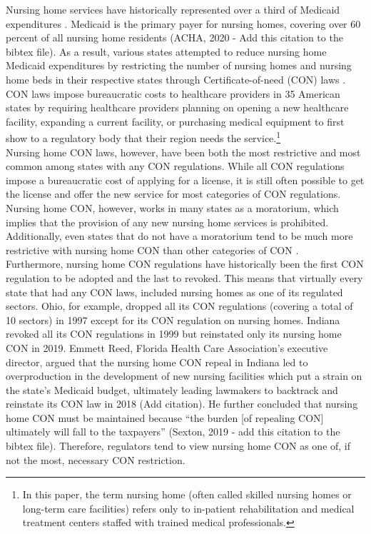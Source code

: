 \documentclass[../Main.tex]{subfiles}
\begin{document}
Nursing home services have historically represented over a third of Medicaid expenditures \citep{wiener1999controlling}. Medicaid is the primary payer for nursing homes, covering over 60 percent of all nursing home residents (ACHA, 2020 - Add this citation to the bibtex file). As a result, various states attempted to reduce nursing home Medicaid expenditures by restricting the number of nursing homes and nursing home beds in their respective states through Certificate-of-need (CON) laws \citep{feder1980regulating,grabowski2003effects,rahman2016impact}. CON laws impose bureaucratic costs to healthcare providers in 35 American states by requiring healthcare providers planning on opening a new healthcare facility, expanding a current facility, or purchasing medical equipment to first show to a regulatory body that their region needs the service.\footnote{In this paper, the term nursing home (often called skilled nursing homes or long-term care facilities) refers only to in-patient rehabilitation and medical treatment centers staffed with trained medical professionals.}\\
\indent Nursing home CON laws, however, have been both the most restrictive and most common among states with any CON regulations. While all CON regulations impose a bureaucratic cost of applying for a license, it is still often possible to get the license and offer the new service for most categories of CON regulations.  Nursing home CON, however, works in many states as a moratorium, which implies that the provision of any new nursing home services is prohibited. Additionally, even states that do not have a moratorium tend to be much more restrictive with nursing home CON than other categories of CON \citep{american2020american}.\\
\indent Furthermore, nursing home CON regulations have historically been the first CON regulation to be adopted and the last to revoked. This means that virtually every state that had any CON laws, included nursing homes as one of its regulated sectors. Ohio, for example, dropped all its CON regulations (covering a total of 10 sectors) in 1997 except for its CON regulation on nursing homes. Indiana revoked all its CON regulations in 1999 but reinstated only its nursing home CON in 2019. Emmett Reed, Florida Health Care Association’s executive director, argued that the nursing home CON repeal in Indiana led to overproduction in the development of new nursing facilities which put a strain on the state’s Medicaid budget, ultimately leading lawmakers to backtrack and reinstate its CON law in 2018 (Add citation). He further concluded that nursing home CON must be maintained because “the burden [of repealing CON] ultimately will fall to the taxpayers” (Sexton, 2019 - add this citation to the bibtex file). Therefore, regulators tend to view nursing home CON as one of, if not the most, necessary CON restriction.\\
\end{document}
